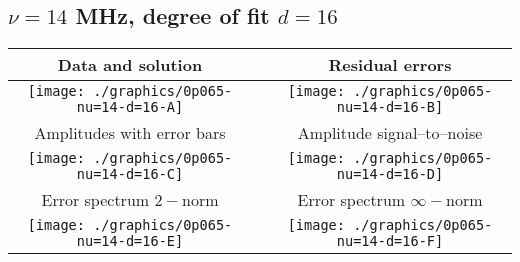 

% 

\clearpage{}
\break{}

\subsection{$\nu = 14$ MHz, degree of fit $d = 16$}

\begin{table}[h]
    \begin{center}
        \begin{tabular}{ccc}
            Data and solution & \quad & Residual errors \\\hline
            \texttt{[image: ./graphics/0p065-nu=14-d=16-A]} &&
            \texttt{[image: ./graphics/0p065-nu=14-d=16-B]} \\[15pt]
            Amplitudes with error bars && Amplitude signal--to--noise \\\hline
            \texttt{[image: ./graphics/0p065-nu=14-d=16-C]} &&
            \texttt{[image: ./graphics/0p065-nu=14-d=16-D]} \\[15pt]
            Error spectrum $2-$norm && Error spectrum $\infty-$norm \\\hline
            \texttt{[image: ./graphics/0p065-nu=14-d=16-E]} &&
            \texttt{[image: ./graphics/0p065-nu=14-d=16-F]} \\[15pt]
        \end{tabular}
    \end{center}
\label{fig:elev=65, nu=14}
\end{table}



\endinput
